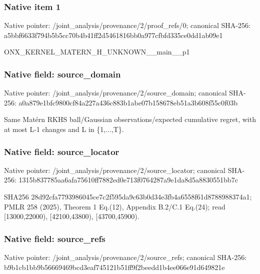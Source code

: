 \documentclass[10pt,a4paper]{article}
\begin{document}
\subsubsection{Native item 1}
Native pointer: /joint\_\allowbreak{}analysis/provenance/2/proof\_\allowbreak{}refs/0; canonical SHA-256: a5bbf6633f794b5b5cc70b4b41ff2d5461816bb0a977cfbfd335ce0dd1ab09e1

\begingroup\raggedright\sloppy ONX\_\allowbreak{}KERNEL\_\allowbreak{}MATERN\_\allowbreak{}H\_\allowbreak{}UNKNOWN\_\allowbreak{}\_\allowbreak{}main\_\allowbreak{}\_\allowbreak{}p1\par\endgroup

\subsubsection{Native field: source\_\allowbreak{}domain}
Native pointer: /joint\_\allowbreak{}analysis/provenance/2/source\_\allowbreak{}domain; canonical SHA-256: a0a879e1bfc9800cf84a227a436c883b1abe07b158678eb51a3b608f55c0f03b

\begingroup\raggedright\sloppy Same Mat{\AtlasUnicodeText é}\allowbreak{}rn RKHS ball/\allowbreak{}Gaussian observations/\allowbreak{}expected cumulative regret,\allowbreak{} with at most L-1 changes and L in \{1,\allowbreak{}...,\allowbreak{}T\}.\par\endgroup

\subsubsection{Native field: source\_\allowbreak{}locator}
Native pointer: /joint\_\allowbreak{}analysis/provenance/2/source\_\allowbreak{}locator; canonical SHA-256: 1315b837785aa6afa75610ff7882ed0e713f0764287a9e1da8d5a8830551bb7c

\begingroup\raggedright\sloppy SHA256 28d92cfa7793986045ce7c2f595da9c63b0d34e3fb4a6558f61d8788988374a1;\allowbreak{} PMLR 258 (2025),\allowbreak{} Theorem 1 Eq.(12),\allowbreak{} Appendix B.2/\allowbreak{}C.1 Eq.(24);\allowbreak{} read [13000,\allowbreak{}22000),\allowbreak{} [42100,\allowbreak{}43800),\allowbreak{} [43700,\allowbreak{}45900).\par\endgroup

\subsubsection{Native field: source\_\allowbreak{}refs}
Native pointer: /joint\_\allowbreak{}analysis/provenance/2/source\_\allowbreak{}refs; canonical SHA-256: b9b1cb1bb9b56669469bcd3eaf745121b51ff9f2beedd1b4ee066e91d649821e
\end{document}
